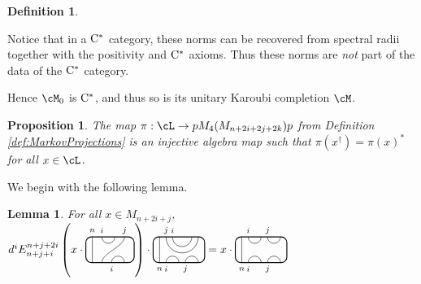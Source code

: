 \documentclass[11pt]{article}
\theoremstyle{plain}
\newtheorem{lem}[thm]{Lemma}
\newtheorem{prop}[thm]{Proposition}
\theoremstyle{definition}
\newtheorem{defn}[thm]{Definition}
\newcommand{\Cstar}{\rm{C^*}}
\begin{document}
\begin{defn}
\begin{itemize}
{Notice that in a $\Cstar$ category, these norms can be recovered from spectral radii together with the positivity and $\Cstar$ axioms.
Thus these norms are \emph{not} part of the data of the $\Cstar$ category.
}
\end{itemize}
Hence $\cM_0$ is $\Cstar$, and thus so is its unitary Karoubi completion $\cM$.
\end{defn}


\begin{prop}
\label{prop:InjectiveAlgebraMap}
The map $\pi: \cL \to pM_4(M_{n+2i+2j+2k})p$ from Definition \ref{def:MarkovProjections} is an injective algebra map such that $\pi(x^\dag) = \pi(x)^*$ for all $x\in \cL$.
\end{prop}


We begin with the following lemma.

 \begin{lem}
 \label{lem:LeftKink}
For all $x \in M_{n+2i+j}$,
$
d^i
E^{n+j+2i}_{n+j+i}
\left(
x
\cdot
\begin{tikzpicture}[baseline = .3cm]
	\draw[thick, rounded corners = 5pt] (0,0) rectangle (1.5,.8);
	\draw (.2,0) -- (.2,.8);
	\draw (.5,.8) arc (-180:0:.2cm);
	\draw (.5,0) .. controls ++(90:.3cm) and ++(270:.3cm) .. (1.2,.8);
	\draw (.8,0) arc (180:0:.2cm);
	\node at (.2,1) {\scriptsize{$n$}};
	\node at (.5,1) {\scriptsize{$i$}};
	\node at (1.2,1) {\scriptsize{$j$}};
	\node at (.8,-.2) {\scriptsize{$i$}};
\end{tikzpicture}
\right)
\cdot
\begin{tikzpicture}[baseline=.3cm]
	\draw[thick, rounded corners = 5pt] (0,0) rectangle (1.6,.8);
	\draw (.2,0) -- (.2,.8);
	\draw (0.4,.8) arc (-180:0:.5);
	\draw (0.6,.8) arc (-180:0:.3);
	\draw (0.4,0) arc (180:0:.2);
	\draw (1,0) arc (180:0:.2);
	\node at (.2,-.2) {\scriptsize{$n$}};
	\node at (.4,1) {\scriptsize{$j$}};
	\node at (.6,1) {\scriptsize{$i$}};
	\node at (.4,-.2) {\scriptsize{$i$}};
	\node at (1,-.2) {\scriptsize{$j$}};
\end{tikzpicture}
=
x\cdot
\begin{tikzpicture}[baseline=.3cm]
	\draw[thick, rounded corners = 5pt] (0,0) rectangle (1.6,.8);
	\draw (.2,0) -- (.2,.8);
	\draw (0.4,0) arc (180:0:.2);
	\draw (1,0) arc (180:0:.2);
	\draw (0.4,.8) arc (-180:0:.2);
	\draw (1,.8) arc (-180:0:.2);
	\node at (.2,-.2) {\scriptsize{$n$}};
	\node at (.4,-.2) {\scriptsize{$i$}};
	\node at (1,-.2) {\scriptsize{$j$}};
	\node at (.4,1) {\scriptsize{$i$}};
	\node at (1,1) {\scriptsize{$j$}};
\end{tikzpicture}
$ 

\end{lem}
\end{document}
